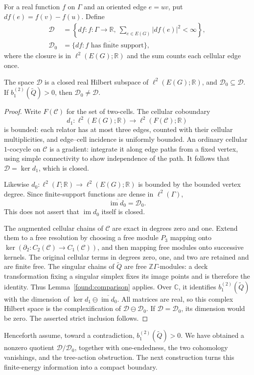For a real function $f$ on $\Gamma$ and an oriented edge $e=uv$,
put $df(e)=f(v)-f(u)$. Define
\[
\begin{aligned}
 \mathcal D&=
 \left\{df:f:\Gamma\to\mathbb R,
                  \ \sum_{e\in E(G)}|df(e)|^2<\infty\right\},\\
 \mathcal D_0&=
 \overline{\{df:f\text{ has finite support}\}},
\end{aligned}
\]
where the closure is in $\ell^2(E(G);\mathbb R)$ and the sum
counts each cellular edge once.

\begin{lemma}\label{found:gradient}
The space $\mathcal D$ is a closed real Hilbert subspace of
$\ell^2(E(G);\mathbb R)$, and $\mathcal D_0\subseteq\mathcal D$.
If $b_1^{(2)}(\widetilde Q)>0$, then
$\mathcal D_0\ne\mathcal D$.
\end{lemma}

\begin{proof}
Write $F(\mathcal C)$ for the set of two-cells.
The cellular coboundary
\[
 d_1:\ell^2(E(G);\mathbb R)\longrightarrow
       \ell^2(F(\mathcal C);\mathbb R)
\]
is bounded: each relator has at most three edges, counted with
their cellular multiplicities, and edge--cell incidence is
uniformly bounded.
An ordinary cellular $1$-cocycle on $\mathcal C$ is a gradient:
integrate it along edge paths from a fixed vertex, using simple
connectivity to show independence of the path.
It follows that $\mathcal D=\ker d_1$, which is closed.

Likewise
$d_0:\ell^2(\Gamma;\mathbb R)\to\ell^2(E(G);\mathbb R)$
is bounded by the bounded vertex degree.
Since finite-support functions are dense in $\ell^2(\Gamma)$,
\[
 \overline{\operatorname{im}d_0}=\mathcal D_0.
\]
This does not assert that $\operatorname{im}d_0$ itself is closed.

The augmented cellular chains of $\mathcal C$ are exact in
degrees zero and one. Extend them to a free resolution by
choosing a free module $P_3$ mapping onto
$\ker(\partial_2:C_2(\mathcal C)\to C_1(\mathcal C))$, and then
mapping free modules onto successive kernels. The original cellular
terms in degrees zero, one, and two are retained and are finite free.
The singular chains of $\widetilde Q$ are free
$\mathbb Z\Gamma$-modules: a deck transformation fixing a
singular simplex fixes its image points and is therefore the
identity. Thus Lemma~\ref{found:comparison} applies.
Over $\mathbb C$, it identifies $b_1^{(2)}(\widetilde Q)$
with the dimension of
$\ker d_1\ominus\overline{\operatorname{im}d_0}$.
All matrices are real, so this complex Hilbert space is the
complexification of $\mathcal D\ominus\mathcal D_0$.
If $\mathcal D=\mathcal D_0$, its dimension would be zero.
The asserted strict inclusion follows.
\end{proof}

Henceforth assume, toward a contradiction,
$b_1^{(2)}(\widetilde Q)>0$.
We have obtained a nonzero quotient $\mathcal D/\mathcal D_0$,
together with one-endedness, the two cohomology vanishings, and
the tree-action obstruction. The next construction turns this
finite-energy information into a compact boundary.
